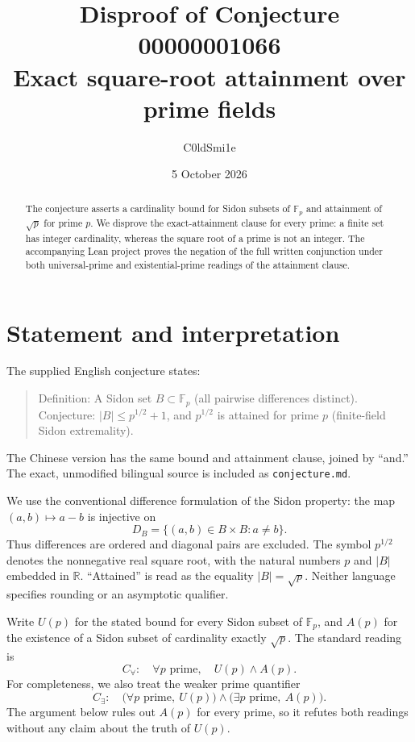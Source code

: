 \documentclass[11pt]{article}
\title{Disproof of Conjecture 00000001066\\[4pt]
\large Exact square-root attainment over prime fields}
\author{C0ldSmi1e}
\date{5 October 2026}
\begin{document}
\maketitle
\begin{abstract}
The conjecture asserts a cardinality bound for Sidon subsets of
$\mathbb F_p$ and attainment of $\sqrt p$ for prime $p$.
We disprove the exact-attainment clause for every prime: a finite
set has integer cardinality, whereas the square root of a prime is
not an integer. The accompanying Lean project proves the negation
of the full written conjunction under both universal-prime and
existential-prime readings of the attainment clause.
\end{abstract}

\section{Statement and interpretation}
The supplied English conjecture states:
\begin{quote}
Definition: A Sidon set $B\subset\mathbb F_p$ (all pairwise differences
distinct). Conjecture: $|B|\le p^{1/2}+1$, and $p^{1/2}$ is attained
for prime $p$ (finite-field Sidon extremality).
\end{quote}
The Chinese version has the same bound and attainment clause, joined
by ``and.'' The exact, unmodified bilingual source is included as
\texttt{conjecture.md}.

We use the conventional difference formulation of the Sidon property:
the map $(a,b)\mapsto a-b$ is injective on
\[
 D_B=\{(a,b)\in B\times B:a\ne b\}.
\]
Thus differences are ordered and diagonal pairs are excluded.
The symbol $p^{1/2}$ denotes the nonnegative real square root, with
the natural numbers $p$ and $|B|$ embedded in $\mathbb R$.
``Attained'' is read as the equality $|B|=\sqrt p$.
Neither language specifies rounding or an asymptotic qualifier.

Write $U(p)$ for the stated bound for every Sidon subset of
$\mathbb F_p$, and $A(p)$ for the existence of a Sidon subset of
cardinality exactly $\sqrt p$. The standard reading is
\[
 C_{\forall}:
 \quad\forall p\text{ prime},\quad U(p)\land A(p).
\]
For completeness, we also treat the weaker prime quantifier
\[
 C_{\exists}:
 \quad\bigl(\forall p\text{ prime},\ U(p)\bigr)
 \land\bigl(\exists p\text{ prime},\ A(p)\bigr).
\]
The argument below rules out $A(p)$ for every prime, so it refutes
both readings without any claim about the truth of $U(p)$.
\end{document}
